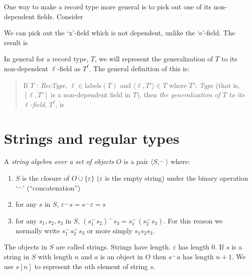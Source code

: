 One way to make a record type more general is to pick out one of its
non-dependent fields.  Consider 
\begin{quote}
\end{quote}
We can pick out the `x'-field which is not dependent, unlike the
`e'-field. The result is
\begin{quote}
\end{quote}
In general for a record type,  $T$, we will represent the generalization
of $T$ to its non-dependent $\ell$-field as $T^\ell$.  The general
definition of this is:
\begin{quote}
If $T$ : \textit{RecType}, $\ell\in\text{labels}(T)$ and
$\langle\ell,T'\rangle\in T$ where $T'$: \textit{Type} (that is,
$[\ell,T']$ is a non-dependent field in $T$), then \textit{the
  generalization of $T$ to its $\ell$-field}, $T^\ell$, is
\begin{quote}
\end{quote}
\end{quote}

\section{Strings and regular types}
\label{sec:regular}
\label{app:strings}

A \textit{string algebra over a set of objects} $O$ is a pair $\langle S,
^{\frown}\rangle$ where:
\begin{enumerate} 
 
\item $S$ is the closure of $O\cup\{\varepsilon\}$ ($\varepsilon$ is the empty string) under the binary operation `$^{\frown}$' (``concatenation'') 
 
\item for any $s$ in $S$, $\varepsilon^{\frown}s = s^{\frown}\varepsilon = s$

\item for any $s_1,s_2,s_3$ in $S$,
  $(s_1^{\frown}s_2)^{\frown}s_3=s_1^{\frown}(s_2^{\frown}s_3)$.  For
  this reason we normally write $s_1^{\frown}s_2^{\frown}s_3$ or more
  simply $s_1s_2s_3$.
 
\end{enumerate}

The objects in $S$ are called strings.  Strings have length.  $\varepsilon$ has
length 0.  If $s$ is a string in $S$
with length $n$ and $a$ is an object in $O$ then $s^{\frown}a$ has
length $n+1$.  We use $s[n]$ to represent the $n$th element of string
$s$.

